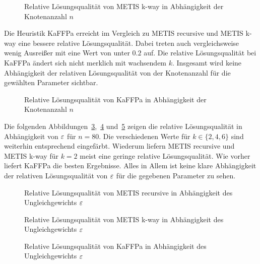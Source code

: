 \begin{figure}[t]
    \centering
    
    \caption{Relative Lösungsqualität von METIS k-way in Abhängigkeit der Knotenanzahl $n$\label{fig:mkwaytreesnodes}}
\end{figure}

Die Heuristik KaFFPa erreicht im Vergleich zu METIS recursive und METIS k-way eine bessere relative Lösungsqualität.
Dabei treten auch vergleichsweise wenig Ausreißer mit eine Wert von unter $0.2$ auf.
Die relative Lösungsqualität bei KaFFPa ändert sich nicht merklich mit wachsendem $k$.
Insgesamt wird keine Abhängigkeit der relativen Lösungsqualität von der Knotenanzahl für die gewählten Parameter sichtbar.

\begin{figure}[h]
    \centering
    
    \caption{Relative Lösungsqualität von KaFFPa in Abhängigkeit der Knotenanzahl $n$\label{fig:kaffpatreesnodes}}
\end{figure}

\pagebreak
Die folgenden Abbildungen~\ref{fig:mrectreesimb},~\ref{fig:mkwaytreesimb} und~\ref{fig:kaffpatreesimb} zeigen die relative Lösungsqualität in Abhängigkeit von $\varepsilon$ für $n=80$.
Die verschiedenen Werte für $k \in \{2,4,6\}$ sind weiterhin entsprechend eingefärbt.
Wiederum liefern METIS recursive und METIS k-way für $k=2$ meist eine geringe relative Lösungsqualität.
Wie vorher liefert KaFFPa die besten Ergebnisse.
Alles in Allem ist keine klare Abhängigkeit der relativen Lösungsqualität von $\varepsilon$ für die gegebenen Parameter zu sehen.

\begin{figure}
    \centering
    
    \caption{Relative Lösungsqualität von METIS recursive in Abhängigkeit des Ungleichgewichts $\varepsilon$\label{fig:mrectreesimb}}
\end{figure}

\begin{figure}
    \centering
    
    \caption{Relative Lösungsqualität von METIS k-way in Abhängigkeit des Ungleichgewichts $\varepsilon$\label{fig:mkwaytreesimb}}
\end{figure}

\begin{figure}
    \centering
    
    \caption{Relative Lösungsqualität von KaFFPa in Abhängigkeit des Ungleichgewichts $\varepsilon$\label{fig:kaffpatreesimb}}
\end{figure}

